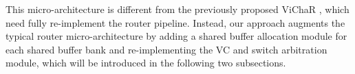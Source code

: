 \documentclass[10pt,conference]{IEEEtran}
\begin{document}
This micro-architecture is different from the previously proposed ViChaR \cite{NPKV06}, which need fully re-implement the router pipeline. Instead, our approach augments the typical router micro-architecture by adding a shared buffer allocation module for each shared buffer bank and re-implementing the VC and switch arbitration module, which will be introduced in the following two subsections.

\end{document}
